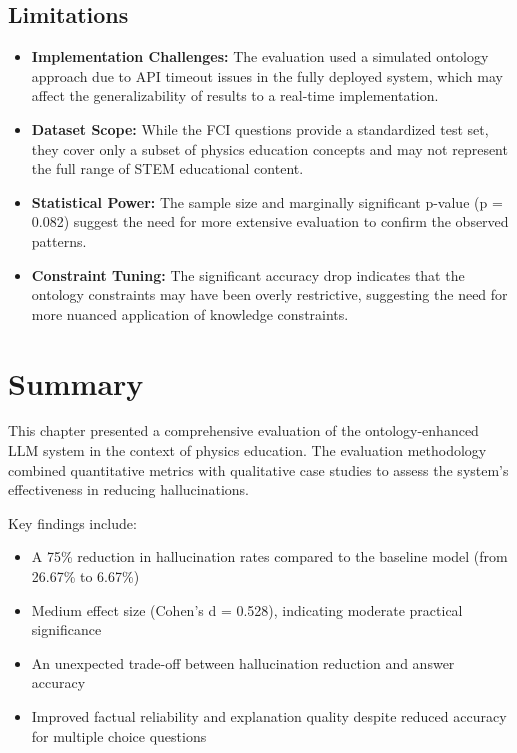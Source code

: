 \subsection{Limitations}
\begin{itemize}
    \item \textbf{Implementation Challenges:} The evaluation used a simulated ontology approach due to API timeout issues in the fully deployed system, which may affect the generalizability of results to a real-time implementation.
    
    \item \textbf{Dataset Scope:} While the FCI questions provide a standardized test set, they cover only a subset of physics education concepts and may not represent the full range of STEM educational content.
    
    \item \textbf{Statistical Power:} The sample size and marginally significant p-value (p = 0.082) suggest the need for more extensive evaluation to confirm the observed patterns.
    
    \item \textbf{Constraint Tuning:} The significant accuracy drop indicates that the ontology constraints may have been overly restrictive, suggesting the need for more nuanced application of knowledge constraints.
\end{itemize}

\section{Summary}
\label{sec:summary}

This chapter presented a comprehensive evaluation of the ontology-enhanced LLM system in the context of physics education. The evaluation methodology combined quantitative metrics with qualitative case studies to assess the system's effectiveness in reducing hallucinations.

Key findings include:
\begin{itemize}
    \item A 75\% reduction in hallucination rates compared to the baseline model (from 26.67\% to 6.67\%)
    \item Medium effect size (Cohen's d = 0.528), indicating moderate practical significance
    \item An unexpected trade-off between hallucination reduction and answer accuracy
    \item Improved factual reliability and explanation quality despite reduced accuracy for multiple choice questions
\end{itemize}

